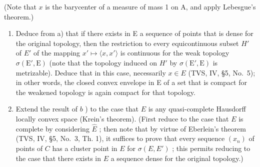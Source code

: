 (Note that \(x\) is the barycenter of a measure of mass 1 on A, and apply Lebesgue's theorem.)

\begin{enumerate}
\def\labelenumi{\alph{enumi})}
\setcounter{enumi}{1}
\item
  Deduce from a) that if there exists in E a sequence of points that is dense for the original topology, then the restriction to every equicontinuous subset \(H'\) of \(E'\) of the mapping \(x' \mapsto \langle x, x' \rangle\) is continuous for the weak topology \(\sigma(\mathrm{E}', \mathrm{E})\) (note that the topology induced on \(H'\) by \(\sigma(\mathrm{E}', \mathrm{E})\) is metrizable). Deduce that in this case, necessarily \(x \in E\) (TVS, IV, §5, No.~5); in other words, the closed convex envelope in E of a set that is compact for the weakened topology is again compact for that topology.
\item
  Extend the result of \(b\) ) to the case that \(E\) is any quasi-complete Hausdorff locally convex space (Krein's theorem). (First reduce to the case that \(E\) is complete by considering \(\widehat{E}\) ; then note that by virtue of Eberlein's theorem (TVS, IV, §5, No.~3, Th. 1), it suffices to prove that every sequence \((x_n)\) of points of \(C\) has a cluster point in \(E\) for \(\sigma(E, E')\) ; this permits reducing to the case that there exists in \(E\) a sequence dense for the original topology.)
\end{enumerate}

